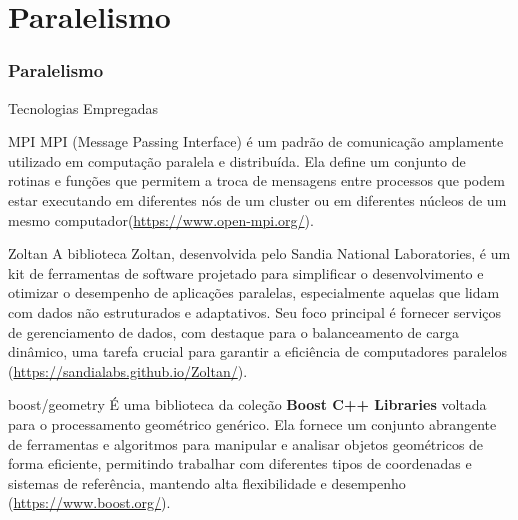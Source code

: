 \documentclass[../main/main.tex]{subfiles}
\begin{document}
\section{Paralelismo}




\begin{frame}
	\frametitle{Paralelismo}
\end{frame}



\begin{frame}{\smaller \smaller Tecnologias Empregadas}
	\vspace{-0.25cm}
	\smaller
	\begin{block}{\smaller MPI}
		MPI (Message Passing Interface) é um padrão de comunicação amplamente utilizado em computação paralela e distribuída. Ela define um conjunto de rotinas e funções que permitem a troca de mensagens entre processos que podem estar executando em diferentes nós de um cluster ou em diferentes núcleos de um mesmo computador(\url{https://www.open-mpi.org/}).
	\end{block}
	\begin{block}{\smaller Zoltan}
		A biblioteca Zoltan, desenvolvida pelo Sandia National Laboratories, é um kit de ferramentas de software projetado para simplificar o desenvolvimento e otimizar o desempenho de aplicações paralelas, especialmente aquelas que lidam com dados não estruturados e adaptativos. Seu foco principal é fornecer serviços de gerenciamento de dados, com destaque para o balanceamento de carga dinâmico, uma tarefa crucial para garantir a eficiência de computadores paralelos (\url{https://sandialabs.github.io/Zoltan/}).
	\end{block}
	\begin{block}{\smaller boost/geometry}
		É uma biblioteca da coleção \textbf{Boost C++ Libraries} voltada para o processamento geométrico genérico. Ela fornece um conjunto abrangente de ferramentas e algoritmos para manipular e analisar objetos geométricos de forma eficiente, permitindo trabalhar com diferentes tipos de coordenadas e sistemas de referência, mantendo alta flexibilidade e desempenho (\url{https://www.boost.org/}).
	\end{block}
\end{frame}
\end{document}
